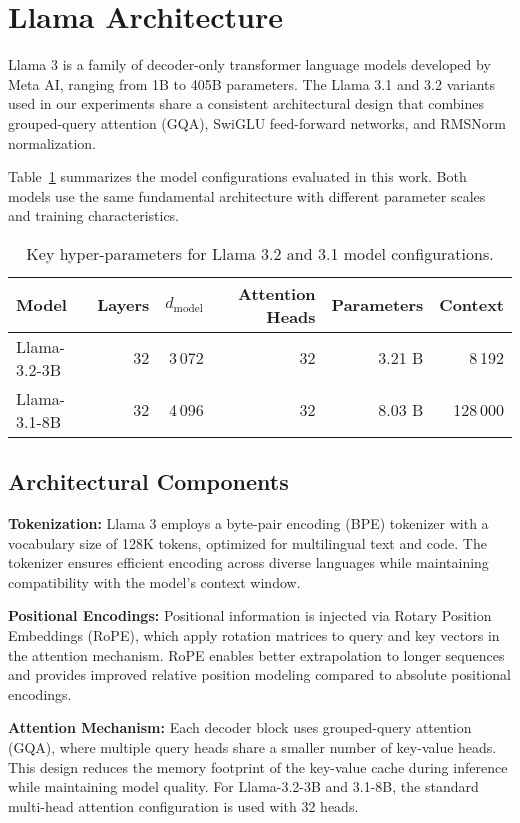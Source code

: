 \section{Llama Architecture}
Llama 3 is a family of decoder-only transformer language models developed by Meta AI, ranging from 1B to 405B parameters. The Llama 3.1 and 3.2 variants used in our experiments share a consistent architectural design that combines grouped-query attention (GQA), SwiGLU feed-forward networks, and RMSNorm normalization.

Table~\ref{tab:llama-sizes} summarizes the model configurations evaluated in this work. Both models use the same fundamental architecture with different parameter scales and training characteristics.

\begin{table}[htbp]
\centering
\caption{Key hyper-parameters for Llama 3.2 and 3.1 model configurations.}
\label{tab:llama-sizes}
\begin{tabular}{@{}lrrrrr@{}}
\toprule
Model & Layers & $d_{\text{model}}$ & Attention Heads & Parameters & Context \\
\midrule
Llama-3.2-3B  & 32 & 3\,072 & 32 & 3.21 B & 8\,192 \\
Llama-3.1-8B  & 32 & 4\,096 & 32 & 8.03 B & 128\,000 \\
\bottomrule
\end{tabular}
\end{table}

\subsection{Architectural Components}

\textbf{Tokenization:} Llama 3 employs a byte-pair encoding (BPE) tokenizer with a vocabulary size of 128K tokens, optimized for multilingual text and code. The tokenizer ensures efficient encoding across diverse languages while maintaining compatibility with the model's context window.

\textbf{Positional Encodings:} Positional information is injected via Rotary Position Embeddings (RoPE), which apply rotation matrices to query and key vectors in the attention mechanism. RoPE enables better extrapolation to longer sequences and provides improved relative position modeling compared to absolute positional encodings.

\textbf{Attention Mechanism:} Each decoder block uses grouped-query attention (GQA), where multiple query heads share a smaller number of key-value heads. This design reduces the memory footprint of the key-value cache during inference while maintaining model quality. For Llama-3.2-3B and 3.1-8B, the standard multi-head attention configuration is used with 32 heads.

